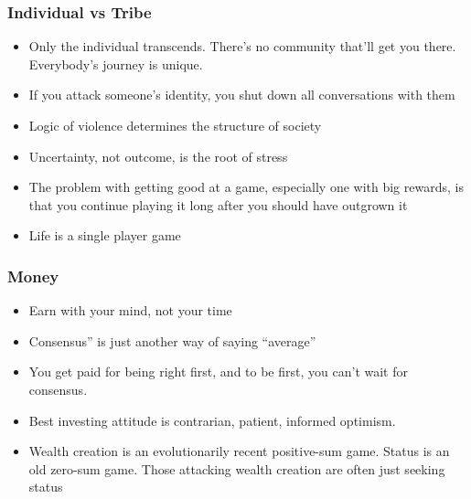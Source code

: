 \begin{frame}[fragile]\frametitle{ Individual vs Tribe}

\begin{itemize}
\item Only the individual transcends. There’s no community that’ll get you there. Everybody’s journey is unique.
\item If you attack someone’s identity, you shut down all conversations with them
\item Logic of violence determines the structure of society
\item Uncertainty, not outcome, is the root of stress
\item The problem with getting good at a game, especially one with big rewards, is that you continue playing it long after you should have outgrown it
\item Life is a single player game
\end{itemize}

\end{frame}

\begin{frame}[fragile]\frametitle{ Money}

\begin{itemize}
\item Earn with your mind, not your time
\item Consensus” is just another way of saying ``average''
\item You get paid for being right first, and to be first, you can’t wait for consensus.
\item Best investing attitude is contrarian, patient, informed optimism.
\item Wealth creation is an evolutionarily recent positive-sum game. Status is an old
zero-sum game. Those attacking wealth creation are often just seeking status
\end{itemize}

\end{frame}